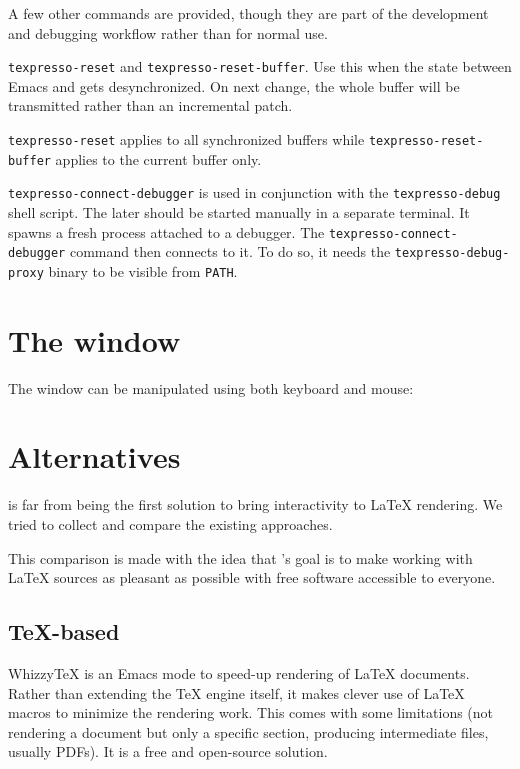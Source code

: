 \documentclass{article}
\begin{document}
A few other commands are provided, though they are part of the \txp development and debugging workflow rather than for normal use.

\texttt{texpresso-reset} and \texttt{texpresso-reset-buffer}. Use this when the state between Emacs and \txp gets desynchronized. On next change, the whole buffer will be transmitted rather than an incremental patch.

\texttt{texpresso-reset} applies to all synchronized buffers while \texttt{texpresso-reset-buffer} applies to the current buffer only.

\texttt{texpresso-connect-debugger} is used in conjunction with the \texttt{texpresso-debug} shell script. The later should be started manually in a separate terminal. It spawns a fresh \txp process attached to a debugger. The \texttt{texpresso-connect-debugger} command then connects to it. To do so, it needs the \texttt{texpresso-debug-proxy} binary to be visible from \texttt{PATH}.

\section{The \txp window}

The window can be manipulated using both keyboard and mouse:

\section{Alternatives}

\txp is far from being the first solution to bring interactivity to \LaTeX{} rendering. We tried to collect and compare the existing approaches.

This comparison is made with the idea that \txp's goal is to make working with
\LaTeX{} sources as pleasant as possible with free software accessible to everyone.

\subsection{\TeX-based}

Whizzy\TeX{} is an Emacs mode to speed-up rendering of \LaTeX{} documents. Rather than extending the \TeX{} engine itself, it makes clever use of \LaTeX{} macros to minimize the rendering work.
This comes with some limitations (not rendering a document but only a specific section, producing intermediate files, usually PDFs). It is a free and open-source solution.
\end{document}
